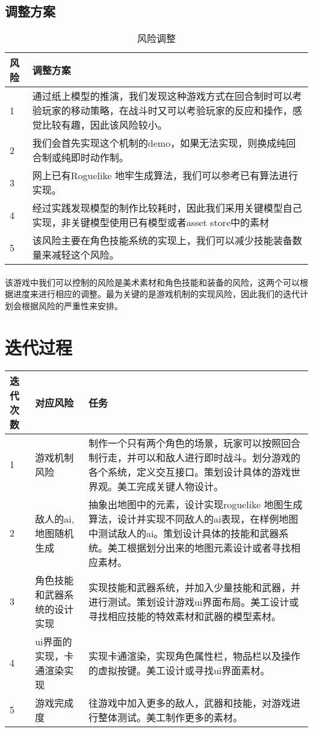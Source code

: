 ﻿\documentclass{article}
\begin{document}
\subsection{调整方案}
\begin{table}[htbp]
	\centering
	\caption{风险调整}
	\begin{tabular}{|p{0.3em}|p{12.0cm}|}
		\hline
		风险 & 调整方案 \\
		\hline
		1 & 通过纸上模型的推演，我们发现这种游戏方式在回合制时可以考验玩家的移动策略，在战斗时又可以考验玩家的反应和操作，感觉比较有趣，因此该风险较小。 \\
		\hline
		2 & 我们会首先实现这个机制的demo，如果无法实现，则换成纯回合制或纯即时动作制。 \\
		\hline
		3 & 网上已有Roguelike 地牢生成算法，我们可以参考已有算法进行实现。 \\
		\hline
		4 & 经过实践发现模型的制作比较耗时，因此我们采用关键模型自己实现，非关键模型使用已有模型或者asset store中的素材 \\
		\hline
		5 & 该风险主要在角色技能系统的实现上，我们可以减少技能装备数量来减轻这个风险。 \\
		\hline
	\end{tabular}
\end{table}
\paragraph{}
该游戏中我们可以控制的风险是美术素材和角色技能和装备的风险，这两个可以根据进度来进行相应的调整。最为关键的是游戏机制的实现风险，因此我们的迭代计划会根据风险的严重性来安排。
\section{迭代过程}
\begin{table}[htbp]
	\centering
	\begin{tabular}{|p{1cm}|p{3cm}|p{8cm}|}
		\hline
		迭代次数 & 对应风险 & 任务 \\
		\hline
		1 & 游戏机制风险 & 制作一个只有两个角色的场景，玩家可以按照回合制行走，并可以和敌人进行即时战斗。划分游戏的各个系统，定义交互接口。策划设计具体的游戏世界观。美工完成关键人物设计。 \\
		\hline
		2 & 敌人的ai,地图随机生成 & 抽象出地图中的元素，设计实现roguelike 地图生成算法，设计并实现不同敌人的ai表现，在样例地图中测试敌人的ai。策划设计具体的技能和武器系统。美工根据划分出来的地图元素设计或者寻找相应素材。 \\
		\hline
		3 & 角色技能和武器系统的设计实现 & 实现技能和武器系统，并加入少量技能和武器，并进行测试。策划设计游戏ui界面布局。美工设计或寻找相应技能的特效素材和武器的模型素材。 \\
		\hline
		4 & ui界面的实现，卡通渲染实现 & 实现卡通渲染，实现角色属性栏，物品栏以及操作的虚拟按键。美工设计或寻找ui界面素材。 \\
		\hline
		5 & 游戏完成度 & 往游戏中加入更多的敌人，武器和技能，对游戏进行整体测试。美工制作更多的素材。 \\
		\hline
	\end{tabular}
\end{table}
\end{document}

